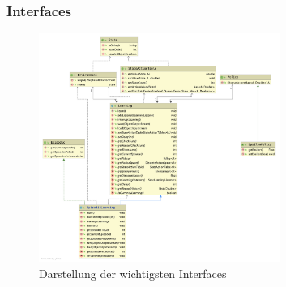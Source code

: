 \subsubsection{Interfaces}
\begin{figure}[H]
    \centering
    \includegraphics[width=0.7\textwidth]{images/Interfaces.png}
    \caption{Darstellung der wichtigsten Interfaces}
    \label{fig:interfaces}
\end{figure}
